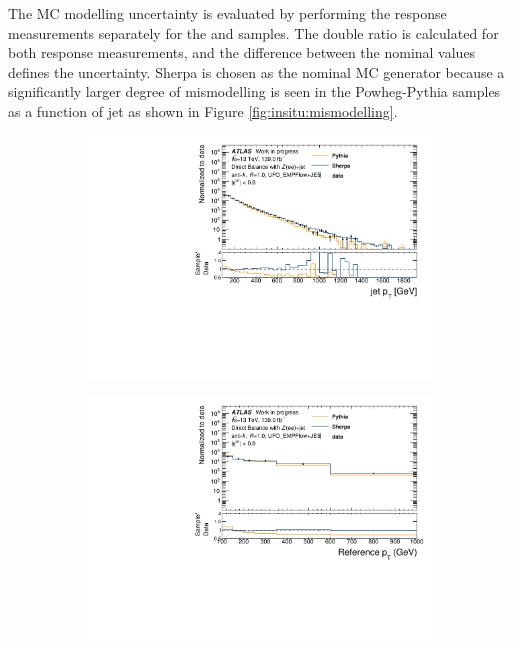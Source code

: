 The MC modelling uncertainty is evaluated by performing the response measurements separately for the \SHERPA and \POWPY samples. The double ratio is calculated for both response measurements, and the difference between the nominal values defines the uncertainty. Sherpa is chosen as the nominal MC generator because a significantly larger degree of mismodelling is seen in the Powheg-Pythia samples as a function of jet \pt as shown in Figure \ref{fig:insitu:mismodelling}.
\begin{figure}[t]
\centering
\begin{subfigure}[b]{0.48\textwidth}
    \centering
    \includegraphics[width=\textwidth]{plots/insitu/Zeejet_Nominal_jetPt_jet0_logY.pdf}
    \caption{}
    \label{fig:insitupt:a}
\end{subfigure}
\hfill
\begin{subfigure}[b]{0.48\textwidth}
    \centering
    \includegraphics[width=\textwidth]{plots/insitu/Zeejet_Nominal_refPt_logY.pdf}

\end{subfigure}
\end{figure}
